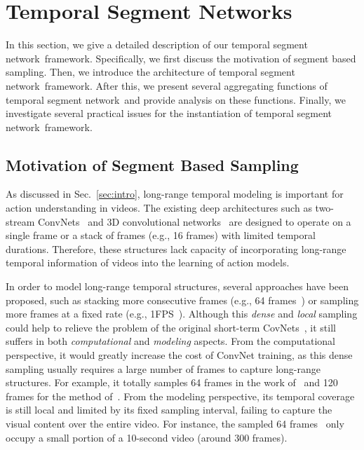 \documentclass[10pt,journal,compsoc]{IEEEtran}
\newcommand{\SEGNET}{temporal segment network}
\begin{document}
\section{Temporal Segment Networks}
\label{sec:vds}

In this section, we give a detailed description of our \SEGNET~framework. Specifically, we first discuss the motivation of segment based sampling. Then, we introduce the architecture of \SEGNET~framework. After this, we present several aggregating functions of \SEGNET~and provide analysis on these functions. Finally, we investigate several practical issues for the instantiation of \SEGNET~framework.

\subsection{Motivation of Segment Based Sampling}

As discussed in Sec.~\ref{sec:intro}, long-range temporal modeling is important for action understanding in videos. The existing deep architectures such as two-stream ConvNets~\cite{SimonyanZ14} and 3D convolutional networks~\cite{TranBFTP15} are designed to operate on a single frame or a stack of frames (e.g., 16 frames) with limited temporal durations. Therefore, these structures lack capacity of incorporating long-range temporal information of videos into the learning of action models.

In order to model long-range temporal structures, several approaches have been proposed, such as stacking more consecutive frames (e.g., 64 frames~\cite{varol}) or sampling more frames at a fixed rate (e.g., 1FPS~\cite{Ng15}). Although this {\em dense} and {\em local} sampling could help to relieve the problem of the original short-term CovNets~\cite{SimonyanZ14,TranBFTP15}, it still suffers in both {\em computational} and {\em modeling} aspects. From the computational perspective, it would greatly increase the cost of ConvNet training, as this dense sampling usually requires a large number of frames to capture long-range structures. For example, it totally samples 64 frames in the work of~\cite{varol} and 120 frames for the method of~\cite{Ng15}. From the modeling perspective, its temporal coverage is still local and limited by its fixed sampling interval, failing to capture the visual content over the entire video. For instance, the sampled 64 frames~\cite{varol} only occupy a small portion of a 10-second video (around 300 frames).
\end{document}
